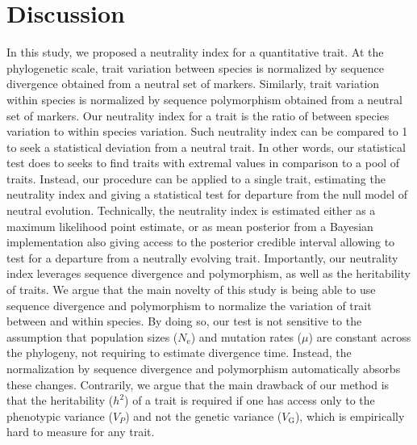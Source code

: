 \documentclass{article}
\newcommand{\Ne}{N_{\text{e}}}
\newcommand{\Trait}{P}
\newcommand{\Heredity}{h^2}
\newcommand{\MutationRate}{\mu}
\newcommand{\VarPhenotype}{V_{\Trait}}
\newcommand{\VarGenetic}{V_{\mathrm{G}}}
\begin{document}
\section{Discussion}\label{sec:discussion}

In this study, we proposed a neutrality index for a quantitative trait.
At the phylogenetic scale, trait variation between species is normalized by sequence divergence obtained from a neutral set of markers.
Similarly, trait variation within species is normalized by sequence polymorphism obtained from a neutral set of markers.
Our neutrality index for a trait is the ratio of between species variation to within species variation.
Such neutrality index can be compared to 1 to seek a statistical deviation from a neutral trait.
In other words, our statistical test does to seeks to find traits with extremal values in comparison to a pool of traits.
Instead, our procedure can be applied to a single trait, estimating the neutrality index and giving a statistical test for departure from the null model of neutral evolution.
Technically, the neutrality index is estimated either as a maximum likelihood point estimate, or as mean posterior from a Bayesian implementation also giving access to the posterior credible interval allowing to test for a departure from a neutrally evolving trait.
Importantly, our neutrality index leverages sequence divergence and polymorphism, as well as the heritability of traits.
We argue that the main novelty of this study is being able to use sequence divergence and polymorphism to normalize the variation of trait between and within species.
By doing so, our test is not sensitive to the assumption that population sizes ($\Ne$) and mutation rates ($\MutationRate$) are constant across the phylogeny, not requiring to estimate divergence time\cite{litsios_effects_2012}.
Instead, the normalization by sequence divergence and polymorphism automatically absorbs these changes\cite{seo_estimating_2004}.
Contrarily, we argue that the main drawback of our method is that the heritability ($\Heredity$) of a trait is required if one has access only to the phenotypic variance ($\VarPhenotype$) and not the genetic variance ($\VarGenetic$), which is empirically hard to measure for any trait.
\end{document}

